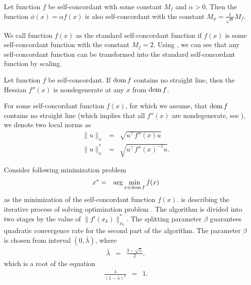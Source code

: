 \begin{corollary}
  Let function $f$ be self-concordant with some constant $M_f$ and $\alpha > 0$. Then the function $\phi(x) = \alpha f(x)$ is also self-concordant with the constant $M_\phi = \frac{1}{\sqrt{\alpha}}M_f$.
\end{corollary}

We call function $f(x)$ as the standard self-concordant function if $f(x)$ is some self-concordant function with the constant $M_f = 2$. Using , we can see that any self-concordant function can be transformed into the standard self-concordant function by scaling.

\begin{theorem}
  Let function $f$ be self-concordant. If $\operatorname{dom} f$ contains no straight line, then the Hessian $f''(x)$ is nondegenerate at any $x$ from $\operatorname{dom} f$.
\end{theorem}

For some self-concordant function $f(x)$, for which we assume, that $\operatorname{dom} f$ contains no straight line (which implies that all $f''(x)$ are nondegenerate, see ), we denote two local norms as
\begin{eqnarray}
  \| u \|_x &=& \sqrt{u^\top f''(x) u}\\
  \| u \|_x^* &=& \sqrt{u^\top f''(x)^{-1} u}.
\end{eqnarray}

Consider following minimization problem
\begin{eqnarray}
  x^* &=& \arg\min_{x\in\dom f} f(x)\labeleq{SDP:scf:minProblem}
\end{eqnarray}
as the minimization of the self-concordant function $f(x)$.
 is describing the iterative process of solving optimization problem .
The algorithm is divided into two stages by the value of $\|f'(x_k)\|_{x_k}^*$.
The splitting parameter $\beta$ guarantees quadratic convergence rate for the second part of the algorithm. The parameter $\beta$ is chosen from interval $(0, \bar{\lambda})$, where
\begin{eqnarray}
  \bar{\lambda} &=& \frac{3 - \sqrt{5}}{2},
\end{eqnarray}
which is a root of the equation
\begin{eqnarray}
  \frac{\lambda}{(1-\lambda)^2} &=& 1.
\end{eqnarray}



